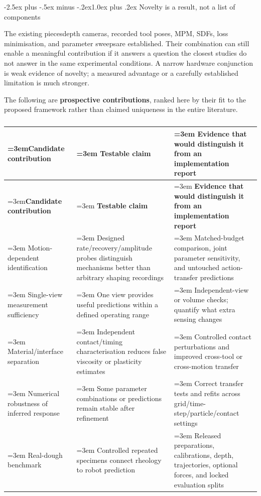 \documentclass[
  11pt,
]{article}
\makeatletter
\renewcommand\subsection{\needspace{5\baselineskip}\@startsection{subsection}{2}{\z@}%
  {-2.5ex plus -.5ex minus -.2ex}{1.0ex plus .2ex}%
  {\normalfont\sffamily\large\bfseries\color{accent}}}
\makeatother
\begin{document}
\subsection{Novelty is a result, not a list of
components}\label{novelty-is-a-result-not-a-list-of-components}

The existing pieces\textemdash{}\allowbreak{}depth cameras, recorded
tool poses, MPM, SDFs, loss minimisation, and parameter
sweeps\textemdash{}\allowbreak{}are established. Their combination can
still enable a meaningful contribution if it answers a question the
closest studies do not answer in the same experimental conditions. A
narrow hardware conjunction is weak evidence of novelty; a measured
advantage or a carefully established limitation is much stronger.

The following are \textbf{prospective contributions}, ranked here by
their fit to the proposed framework rather than claimed uniqueness in
the entire literature.

\begin{small}
\begin{longtable}{@{}>{\raggedright\sloppy\emergencystretch=3em\arraybackslash}p{} >{\raggedright\sloppy\emergencystretch=3em\arraybackslash}p{} >{\raggedright\sloppy\emergencystretch=3em\arraybackslash}p{}@{}}
\caption{}\\
\toprule
\textbf{Candidate contribution} & \textbf{Testable claim} & \textbf{Evidence that would distinguish it from an implementation report} \\
\midrule
\endfirsthead
\toprule
\textbf{Candidate contribution} & \textbf{Testable claim} & \textbf{Evidence that would distinguish it from an implementation report} \\
\midrule
\endhead
Motion-dependent identification & Designed rate/recovery/amplitude probes distinguish mechanisms better
than arbitrary shaping recordings & Matched-budget comparison, joint parameter sensitivity, and untouched
action-transfer predictions \\
\hline
Single-view measurement sufficiency & One view provides useful predictions within a defined operating range & Independent-view or volume checks; quantify what extra sensing changes \\
\hline
Material/interface separation & Independent contact/timing characterisation reduces false viscosity or
plasticity estimates & Controlled contact perturbations and improved cross-tool or cross-motion
transfer \\
\hline
Numerical robustness of inferred response & Some parameter combinations or predictions remain stable after
refinement & Correct transfer tests and refits across grid/time-step/particle/contact
settings \\
\hline
Real-dough benchmark & Controlled repeated specimens connect rheology to robot prediction & Released preparations, calibrations, depth, trajectories, optional
forces, and locked evaluation splits \\
\bottomrule
\end{longtable}
\end{small}
\end{document}
